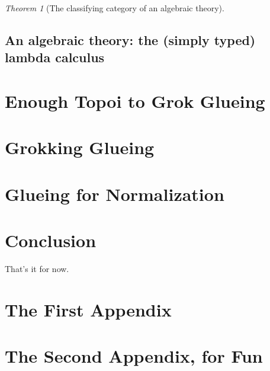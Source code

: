 \documentclass[12pt,twoside]{reedthesis}
\theoremstyle{definition}
\theoremstyle{remark}
\theoremstyle{theorem}
\newtheorem{theorem}{Theorem}
\begin{document}
\begin{theorem}[The classifying category of an algebraic theory]\label{thm:classifying alg theory}
\end{theorem}


\section{An algebraic theory: the (simply typed) lambda calculus}


\chapter{Enough Topoi to Grok Glueing}
\chapter{Grokking Glueing}
\chapter{Glueing for Normalization}

\chapter*{Conclusion}
\setcounter{chapter}{4}
\setcounter{section}{0}

That's it for now.

\appendix
\chapter{The First Appendix}
\chapter{The Second Appendix, for Fun}



\backmatter%

\nocite{*}


% 


\end{document}
